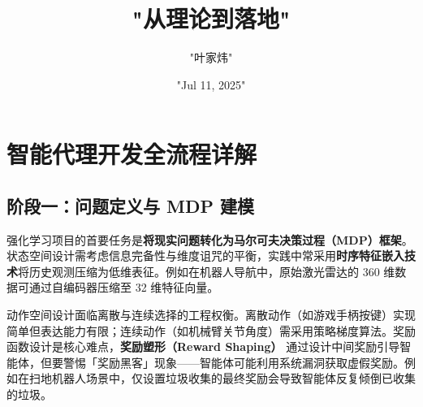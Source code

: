 \title{"从理论到落地"}
\author{"叶家炜"}
\date{"Jul 11, 2025"}
\maketitle
\chapter{智能代理开发全流程详解}
\section{阶段一：问题定义与 MDP 建模}
强化学习项目的首要任务是\textbf{将现实问题转化为马尔可夫决策过程（MDP）框架}。状态空间设计需考虑信息完备性与维度诅咒的平衡，实践中常采用\textbf{时序特征嵌入技术}将历史观测压缩为低维表征。例如在机器人导航中，原始激光雷达的 360 维数据可通过自编码器压缩至 32 维特征向量。\par
动作空间设计面临离散与连续选择的工程权衡。离散动作（如游戏手柄按键）实现简单但表达能力有限；连续动作（如机械臂关节角度）需采用策略梯度算法。奖励函数设计是核心难点，\textbf{奖励塑形（Reward Shaping）} 通过设计中间奖励引导智能体，但要警惕「奖励黑客」现象——智能体可能利用系统漏洞获取虚假奖励。例如在扫地机器人场景中，仅设置垃圾收集的最终奖励会导致智能体反复倾倒已收集的垃圾。\par
